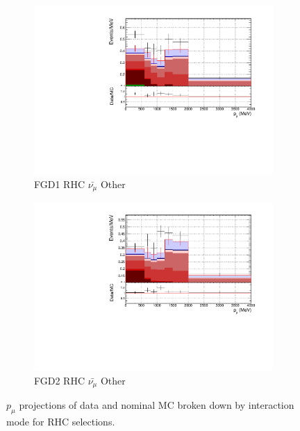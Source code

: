 \begin{figure}[!htbp]
\begin{subfigure}{0.49\textwidth}
  \centering
  \includegraphics[width=\textwidth]{figs/FGD1_anti-numuCC_other_p}
  \caption{FGD1 RHC $\bar{\nu_{\mu}}$ Other}
\end{subfigure}
\begin{subfigure}{0.49\textwidth}
  \centering
  \includegraphics[width=\textwidth]{figs/FGD2_anti-numuCC_other_p}
  \caption{FGD2 RHC $\bar{\nu_{\mu}}$ Other}
\end{subfigure}
\caption{$p_{\mu}$ projections of data and nominal MC broken down by interaction mode for RHC \numub selections.}
\label{fig:pstack_rhc_numub}
\end{figure}

